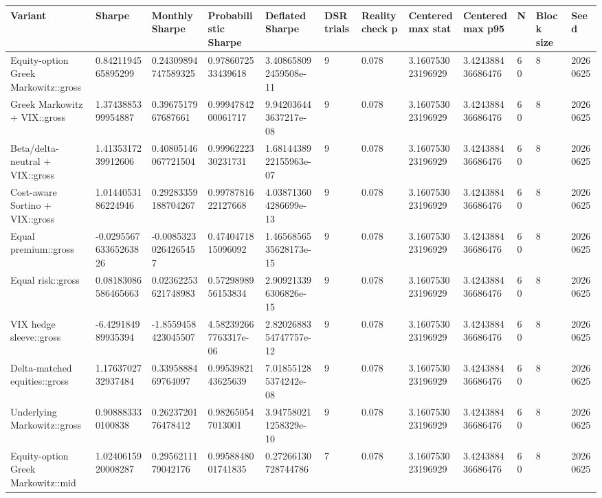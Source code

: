 \begin{tabular}{llllllllllll}
\toprule
Variant & Sharpe & Monthly Sharpe & Probabilistic Sharpe & Deflated Sharpe & DSR trials & Reality check p & Centered max stat & Centered max p95 & N & Block size & Seed \\
\midrule
Equity-option Greek Markowitz::gross & 0.8421194565895299 & 0.24309894747589325 & 0.9786072533439618 & 3.408658092459508e-11 & 9 & 0.078 & 3.160753023196929 & 3.424388436686476 & 60 & 8 & 20260625 \\
Greek Markowitz + VIX::gross & 1.3743885399954887 & 0.3967517967687661 & 0.9994784200061717 & 9.942036443637217e-08 & 9 & 0.078 & 3.160753023196929 & 3.424388436686476 & 60 & 8 & 20260625 \\
Beta/delta-neutral + VIX::gross & 1.4135317239912606 & 0.40805146067721504 & 0.9996222330231731 & 1.6814438922155963e-07 & 9 & 0.078 & 3.160753023196929 & 3.424388436686476 & 60 & 8 & 20260625 \\
Cost-aware Sortino + VIX::gross & 1.0144053186224946 & 0.29283359188704267 & 0.9978781622127668 & 4.038713604286699e-13 & 9 & 0.078 & 3.160753023196929 & 3.424388436686476 & 60 & 8 & 20260625 \\
Equal premium::gross & -0.029556763365263826 & -0.00853230264265457 & 0.4740471815096092 & 1.4656856535628173e-15 & 9 & 0.078 & 3.160753023196929 & 3.424388436686476 & 60 & 8 & 20260625 \\
Equal risk::gross & 0.08183086586465663 & 0.02362253621748983 & 0.5729898956153834 & 2.909213396306826e-15 & 9 & 0.078 & 3.160753023196929 & 3.424388436686476 & 60 & 8 & 20260625 \\
VIX hedge sleeve::gross & -6.429184989935394 & -1.8559458423045507 & 4.582392667763317e-06 & 2.8202688354747757e-12 & 9 & 0.078 & 3.160753023196929 & 3.424388436686476 & 60 & 8 & 20260625 \\
Delta-matched equities::gross & 1.1763702732937484 & 0.3395888469764097 & 0.9953982143625639 & 7.018551285374242e-08 & 9 & 0.078 & 3.160753023196929 & 3.424388436686476 & 60 & 8 & 20260625 \\
Underlying Markowitz::gross & 0.908883330100838 & 0.2623720176478412 & 0.982650547013001 & 3.947580211258329e-10 & 9 & 0.078 & 3.160753023196929 & 3.424388436686476 & 60 & 8 & 20260625 \\
Equity-option Greek Markowitz::mid & 1.0240615920008287 & 0.2956211179042176 & 0.9958848001741835 & 0.27266130728744786 & 7 & 0.078 & 3.160753023196929 & 3.424388436686476 & 60 & 8 & 20260625 \\

\end{tabular}
